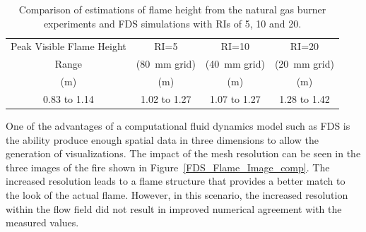 \documentclass[twoside]{uocthesis}
\begin{document}
{\begin{table}[h]
  \small
  \centering
  \begin{tabular}{|c|c|c|c|}
    \hline Peak Visible Flame Height   	& RI=5       		& RI=10      		& RI=20  \\
    Range          						&  (80~mm grid)  	&  (40~mm grid)  	&  (20~mm grid)  \\
    (m)     							& (m) 				& (m) 				& (m)  			 \\ 
    \hline 0.83 to 1.14         		& 1.02 to 1.27      & 1.07 to 1.27      & 1.28 to 1.42   \\
    \hline
  \end{tabular}
  \caption[Comparison of estimations of flame height from the natural gas burner experiments and FDS simulations with RIs of 5, 10 and 20.]{Comparison of estimations of flame height from the natural gas burner experiments and FDS simulations with RIs of 5, 10 and 20.}
  \label{tab:FDS_FH}
\end{table}

One of the advantages of a computational fluid dynamics model such as FDS is the ability produce enough spatial data in three dimensions to allow the generation of visualizations.  The impact of the mesh resolution can be seen in the three images of the fire shown in Figure~\ref{FDS_Flame_Image_comp}.  The increased resolution leads to a flame structure that provides a better match to the look of the actual flame.  However, in this scenario, the increased resolution within the flow field did not result in improved numerical agreement with the measured values.

}
\end{document}
